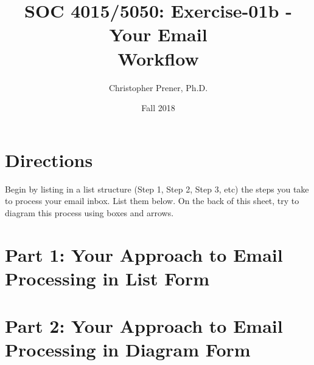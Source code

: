\documentclass{tufte-handout}
\title{SOC 4015/5050: Exercise-01b - Your Email \\Workflow}
\author{Christopher Prener, Ph.D.}
\date{Fall 2018}
\begin{document}
\maketitle %

\vspace{5mm}
\section{Directions}
Begin by listing in a list structure (Step 1, Step 2, Step 3, etc) the steps you take to process your email inbox. List them below. On the back of this sheet, try to diagram this process using boxes and arrows.

\vspace{5mm}
\section{Part 1: Your Approach to Email Processing in List Form}

\newpage
\section{Part 2: Your Approach to Email Processing in Diagram Form}

\end{document}
